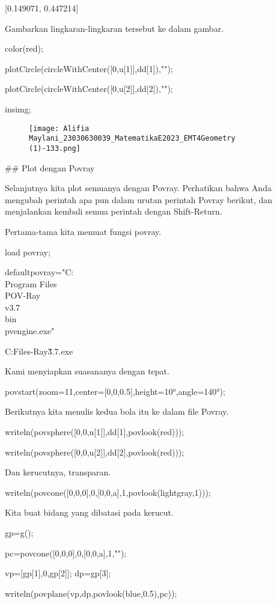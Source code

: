 \documentclass{article}
\begin{document}
    [0.149071,  0.447214]

Gambarkan lingkaran-lingkaran tersebut ke dalam gambar.


\>color(red);

\>plotCircle(circleWithCenter([0,u[1]],dd[1]),"");

\>plotCircle(circleWithCenter([0,u[2]],dd[2]),"");

\>insimg;


\begin{figure}
    \centering
    \texttt{[image: Alifia Maylani\_23030630039\_MatematikaE2023\_EMT4Geometry (1)-133.png]}
    \caption{}
    \label{fig:enter-label}
\end{figure}

## Plot dengan Povray

Selanjutnya kita plot semuanya dengan Povray. Perhatikan bahwa Anda
mengubah perintah apa pun dalam urutan perintah Povray berikut, dan
menjalankan kembali semua perintah dengan Shift-Return.


Pertama-tama kita memuat fungsi povray.


\>load povray;

\>defaultpovray="C:\\Program Files\\POV-Ray\\v3.7\\bin\\pvengine.exe"


    C:\Program Files\POV-Ray\v3.7\bin\pvengine.exe

Kami menyiapkan suasananya dengan tepat.


\>povstart(zoom=11,center=[0,0,0.5],height=10°,angle=140°);


Berikutnya kita menulis kedua bola itu ke dalam file Povray.


\>writeln(povsphere([0,0,u[1]],dd[1],povlook(red)));

\>writeln(povsphere([0,0,u[2]],dd[2],povlook(red)));


Dan kerucutnya, transparan.


\>writeln(povcone([0,0,0],0,[0,0,a],1,povlook(lightgray,1)));


Kita buat bidang yang dibatasi pada kerucut.


\>gp=g();

\>pc=povcone([0,0,0],0,[0,0,a],1,"");

\>vp=[gp[1],0,gp[2]]; dp=gp[3];

\>writeln(povplane(vp,dp,povlook(blue,0.5),pc));
\end{document}
